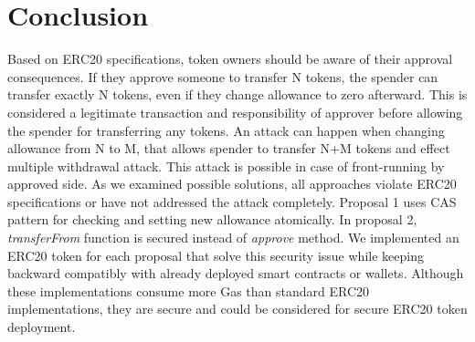 
\linespread{1.25}
\section{Conclusion}
Based on ERC20 specifications, token owners should be aware of their approval consequences. If they approve someone to transfer N tokens, the spender can transfer exactly N tokens, even if they change allowance to zero afterward. This is considered a legitimate transaction and responsibility of approver before allowing the spender for transferring any tokens. An attack can happen when changing allowance from N to M, that allows spender to transfer N+M tokens and effect multiple withdrawal attack. This attack is possible in case of front-running by approved side. As we examined possible solutions, all approaches violate ERC20 specifications or have not addressed the attack completely. Proposal 1 uses CAS pattern for checking and setting new allowance atomically. In proposal 2, \textit{transferFrom} function is secured instead of \textit{approve} method. We implemented an ERC20 token for each proposal that solve this security issue while keeping backward compatibly with already deployed smart contracts or wallets. Although these implementations consume more Gas than standard ERC20 implementations, they are secure and could be considered for secure ERC20 token deployment.
